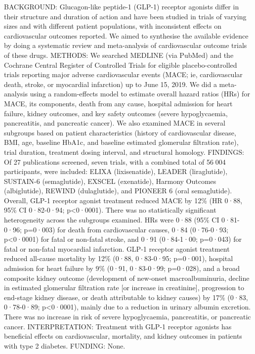 \documentclass[]{article}
\begin{document}
BACKGROUND: Glucagon-like peptide-1 (GLP-1) receptor agonists differ in
their structure and duration of action and have been studied in trials
of varying sizes and with different patient populations, with
inconsistent effects on cardiovascular outcomes reported. We aimed to
synthesise the available evidence by doing a systematic review and
meta-analysis of cardiovascular outcome trials of these drugs. METHODS:
We searched MEDLINE (via PubMed) and the Cochrane Central Register of
Controlled Trials for eligible placebo-controlled trials reporting major
adverse cardiovascular events (MACE; ie, cardiovascular death, stroke,
or myocardial infarction) up to June 15, 2019. We did a meta-analysis
using a random-effects model to estimate overall hazard ratios (HRs) for
MACE, its components, death from any cause, hospital admission for heart
failure, kidney outcomes, and key safety outcomes (severe hypoglycaemia,
pancreatitis, and pancreatic cancer). We also examined MACE in several
subgroups based on patient characteristics (history of cardiovascular
disease, BMI, age, baseline HbA1c, and baseline estimated glomerular
filtration rate), trial duration, treatment dosing interval, and
structural homology. FINDINGS: Of 27 publications screened, seven
trials, with a combined total of 56 004 participants, were included:
ELIXA (lixisenatide), LEADER (liraglutide), SUSTAIN-6 (semaglutide),
EXSCEL (exenatide), Harmony Outcomes (albiglutide), REWIND
(dulaglutide), and PIONEER 6 (oral semaglutide). Overall, GLP-1 receptor
agonist treatment reduced MACE by 12\% (HR 0·88, 95\% CI 0·82-0·94;
p\textless{}0·0001). There was no statistically significant
heterogeneity across the subgroups examined. HRs were 0·88 (95\% CI
0·81-0·96; p=0·003) for death from cardiovascular causes, 0·84
(0·76-0·93; p\textless{}0·0001) for fatal or non-fatal stroke, and 0·91
(0·84-1·00; p=0·043) for fatal or non-fatal myocardial infarction. GLP-1
receptor agonist treatment reduced all-cause mortality by 12\% (0·88,
0·83-0·95; p=0·001), hospital admission for heart failure by 9\% (0·91,
0·83-0·99; p=0·028), and a broad composite kidney outcome (development
of new-onset macroalbuminuria, decline in estimated glomerular
filtration rate {[}or increase in creatinine{]}, progression to
end-stage kidney disease, or death attributable to kidney causes) by
17\% (0·83, 0·78-0·89; p\textless{}0·0001), mainly due to a reduction in
urinary albumin excretion. There was no increase in risk of severe
hypoglycaemia, pancreatitis, or pancreatic cancer. INTERPRETATION:
Treatment with GLP-1 receptor agonists has beneficial effects on
cardiovascular, mortality, and kidney outcomes in patients with type 2
diabetes. FUNDING: None.
\end{document}
